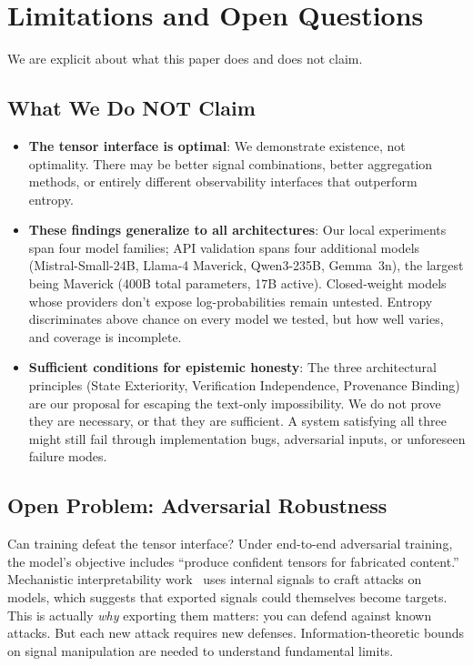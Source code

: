 \documentclass[11pt]{article}
\begin{document}
\section{Limitations and Open Questions}\label{sec:discussion}

We are explicit about what this paper does and does not claim.

\subsection{What We Do NOT Claim}

\begin{itemize}
    \item \textbf{The tensor interface is optimal}: We demonstrate existence, not optimality. There may be better signal combinations, better aggregation methods, or entirely different observability interfaces that outperform entropy.

    \item \textbf{These findings generalize to all architectures}: Our local experiments span four model families; API validation spans four additional models (Mistral-Small-24B, Llama-4 Maverick, Qwen3-235B, Gemma~3n), the largest being Maverick (400B total parameters, 17B active). Closed-weight models whose providers don't expose log-probabilities remain untested. Entropy discriminates above chance on every model we tested, but how well varies, and coverage is incomplete.

    \item \textbf{Sufficient conditions for epistemic honesty}: The three architectural principles (State Exteriority, Verification Independence, Provenance Binding) are our proposal for escaping the text-only impossibility. We do not prove they are necessary, or that they are sufficient. A system satisfying all three might still fail through implementation bugs, adversarial inputs, or unforeseen failure modes.
\end{itemize}

\subsection{Open Problem: Adversarial Robustness}

Can training defeat the tensor interface? Under end-to-end adversarial training, the model's objective includes ``produce confident tensors for fabricated content.'' Mechanistic interpretability work~\citep{winninger2025usingmechanisticinterpretabilitycraft} uses internal signals to craft attacks on models, which suggests that exported signals could themselves become targets. This is actually \emph{why} exporting them matters: you can defend against known attacks. But each new attack requires new defenses. Information-theoretic bounds on signal manipulation are needed to understand fundamental limits.
\end{document}
